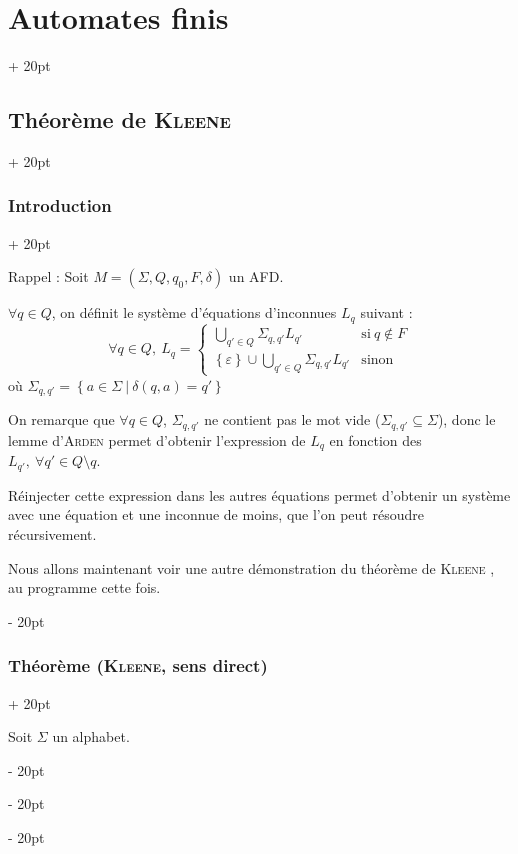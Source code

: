\documentclass[a4paper, 12pt, twoside]{article}
\newcommand{\set}[1]{\left\{ #1 \right\}}
\newcommand{\ind}[1][20pt]{\advance\leftskip + #1}
\newcommand{\deind}[1][20pt]{\advance\leftskip - #1}
\newenvironment{indt}[2][20pt]{#2 \par \ind[#1]}{\par \deind} %
\begin{document}
\begin{indt}{\section{Automates finis}}
\begin{indt}{\subsection{Théorème de \textsc{Kleene}}}
\begin{indt}{\subsubsection{Introduction}}
                \vspace{12pt}
                
                Rappel :
                Soit $M = (\Sigma, Q, q_0, F, \delta)$ un AFD.

                $\forall q \in Q$, on définit le système d'équations d'inconnues $L_q$ suivant :
                \[
                    \forall q \in Q,\
                    L_q =
                    \begin{cases}
                        \displaystyle
                        \bigcup_{q' \in Q} \Sigma_{q, q'} L_{q'}
                        & \text{si}\ q \notin F
                        \\
                        \displaystyle
                        \set \varepsilon \cup
                        \bigcup_{q' \in Q} \Sigma_{q, q'} L_{q'}
                        & \text{sinon}
                    \end{cases}
                \]
                où $\Sigma_{q, q'} = \set{a \in \Sigma\ |\ \delta(q, a) = q'}$

                \vspace{6pt}
                
                On remarque que $\forall q \in Q$, $\Sigma_{q, q'}$ ne contient pas le mot vide ($\Sigma_{q, q'} \subseteq \Sigma$), donc le lemme d'\textsc{Arden} permet d'obtenir l'expression de $L_q$ en fonction des $L_{q'},\ \forall q' \in Q \setminus q$.

                Réinjecter cette expression dans les autres équations permet d'obtenir un système avec une équation et une inconnue de moins, que l'on peut résoudre récursivement.

                \vspace{12pt}
                
                Nous allons maintenant voir une autre démonstration du théorème de \textsc{Kleene} , au programme cette fois.
            \end{indt}

            \vspace{12pt}
            
            \begin{indt}{\subsubsection{Théorème (\textsc{Kleene}, sens direct)}}
                \begin{emphBox}
                    Soit $\Sigma$ un alphabet.


\end{emphBox}
\end{indt}
\end{indt}
\end{indt}
\end{document}
